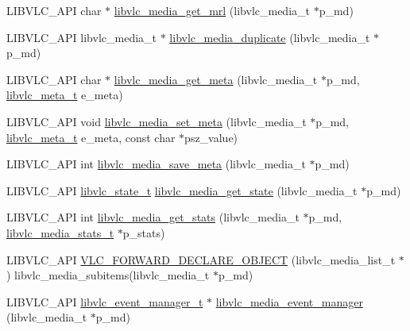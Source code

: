 \begin{DoxyCompactItemize}
\item 
L\+I\+B\+V\+L\+C\+\_\+\+A\+PI char $\ast$ \hyperlink{group__libvlc__media_ga88cd51e19ac7848bb15352eeddd32b9c}{libvlc\+\_\+media\+\_\+get\+\_\+mrl} (libvlc\+\_\+media\+\_\+t $\ast$p\+\_\+md)
\item 
L\+I\+B\+V\+L\+C\+\_\+\+A\+PI libvlc\+\_\+media\+\_\+t $\ast$ \hyperlink{group__libvlc__media_ga638229cdb4fbb5708df632dd631534f9}{libvlc\+\_\+media\+\_\+duplicate} (libvlc\+\_\+media\+\_\+t $\ast$p\+\_\+md)
\item 
L\+I\+B\+V\+L\+C\+\_\+\+A\+PI char $\ast$ \hyperlink{group__libvlc__media_ga47684ea1970f0c5cddb96a717a75ed6f}{libvlc\+\_\+media\+\_\+get\+\_\+meta} (libvlc\+\_\+media\+\_\+t $\ast$p\+\_\+md, \hyperlink{group__libvlc__media_ga90e7814a020f87d4c443d8d09b6dd4a0}{libvlc\+\_\+meta\+\_\+t} e\+\_\+meta)
\item 
L\+I\+B\+V\+L\+C\+\_\+\+A\+PI void \hyperlink{group__libvlc__media_gae116bf2e93c0e51aa5824f6e69aeaa64}{libvlc\+\_\+media\+\_\+set\+\_\+meta} (libvlc\+\_\+media\+\_\+t $\ast$p\+\_\+md, \hyperlink{group__libvlc__media_ga90e7814a020f87d4c443d8d09b6dd4a0}{libvlc\+\_\+meta\+\_\+t} e\+\_\+meta, const char $\ast$psz\+\_\+value)
\item 
L\+I\+B\+V\+L\+C\+\_\+\+A\+PI int \hyperlink{group__libvlc__media_ga7b5c8c9206b71627a1a600e165d3c1e5}{libvlc\+\_\+media\+\_\+save\+\_\+meta} (libvlc\+\_\+media\+\_\+t $\ast$p\+\_\+md)
\item 
L\+I\+B\+V\+L\+C\+\_\+\+A\+PI \hyperlink{group__libvlc__media_gac88ad60037ea05e1f23675a2ebe31efc}{libvlc\+\_\+state\+\_\+t} \hyperlink{group__libvlc__media_ga894c92329fb83d8b55f105b4e1fdfbb8}{libvlc\+\_\+media\+\_\+get\+\_\+state} (libvlc\+\_\+media\+\_\+t $\ast$p\+\_\+md)
\item 
L\+I\+B\+V\+L\+C\+\_\+\+A\+PI int \hyperlink{group__libvlc__media_ga8043c9dbf07c6286e918d7d38e467c3e}{libvlc\+\_\+media\+\_\+get\+\_\+stats} (libvlc\+\_\+media\+\_\+t $\ast$p\+\_\+md, \hyperlink{structlibvlc__media__stats__t}{libvlc\+\_\+media\+\_\+stats\+\_\+t} $\ast$p\+\_\+stats)
\item 
L\+I\+B\+V\+L\+C\+\_\+\+A\+PI \hyperlink{group__libvlc__media_gaacfff95cbbba67b39a47b7bdbfff1dba}{V\+L\+C\+\_\+\+F\+O\+R\+W\+A\+R\+D\+\_\+\+D\+E\+C\+L\+A\+R\+E\+\_\+\+O\+B\+J\+E\+CT} (libvlc\+\_\+media\+\_\+list\+\_\+t $\ast$) libvlc\+\_\+media\+\_\+subitems(libvlc\+\_\+media\+\_\+t $\ast$p\+\_\+md)
\item 
L\+I\+B\+V\+L\+C\+\_\+\+A\+PI \hyperlink{group__libvlc__event_gaa82f247503d3558b9117550e8d3c9259}{libvlc\+\_\+event\+\_\+manager\+\_\+t} $\ast$ \hyperlink{group__libvlc__media_ga92b9e97a3e37e91abe9dcafd2387f2cc}{libvlc\+\_\+media\+\_\+event\+\_\+manager} (libvlc\+\_\+media\+\_\+t $\ast$p\+\_\+md)

\end{DoxyCompactItemize}
